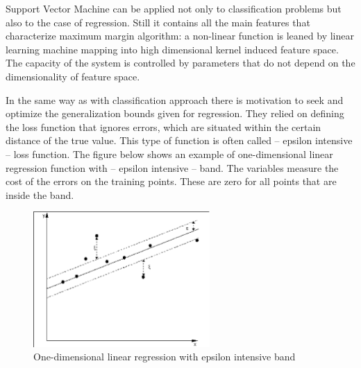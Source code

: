 Support Vector Machine can be applied not only to classification problems but also to the
case of regression.
Still it contains all the main features that characterize maximum margin algorithm:
a non-linear function is leaned by linear learning machine mapping into high dimensional kernel
induced feature space.
The capacity of the system is controlled by parameters that do not depend on the dimensionality
of feature space.

In the same way as with classification approach there is motivation to seek and optimize the
generalization bounds given for regression.
They relied on defining the loss function that ignores errors, which are situated within
the certain distance of the true value.
This type of function is often called – epsilon intensive – loss function. 
The figure below shows an example of one-dimensional linear regression function with – 
epsilon intensive – band. The variables measure the cost of the errors on the training points.
These are zero for all points that are inside the band. 
\begin{figure}[htb] 
	\label{fig:svm1}
	\centering
	\includegraphics[width=0.6\textwidth]{figures/svm1}
	\caption{One-dimensional linear regression with epsilon intensive band}
\end{figure}

